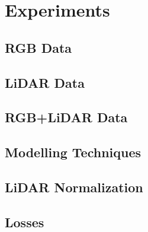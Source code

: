 \section{Experiments}%
\label{sec:experiments}

\subsection{RGB Data}%
\label{sec:rgb-experiment}


\subsection{LiDAR Data}


\subsection{RGB+LiDAR Data}


\subsection{Modelling Techniques}


\subsection{LiDAR Normalization}
%
\label{sec:normalization-experiment}

\subsection{Losses}

